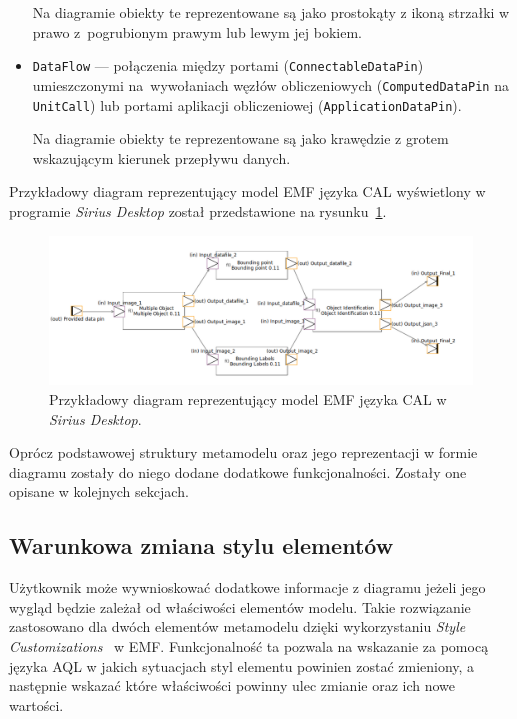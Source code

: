 \begin{itemize}
	      Na diagramie obiekty te reprezentowane są jako prostokąty z ikoną strzałki w prawo z~pogrubionym prawym lub lewym jej bokiem.

	\item \texttt{DataFlow} --- połączenia między portami
	      (\texttt{ConnectableDataPin}) umieszczonymi na~wywołaniach węzłów
	      obliczeniowych (\texttt{ComputedDataPin} na \texttt{UnitCall}) lub portami aplikacji obliczeniowej (\texttt{ApplicationDataPin}).

	      Na diagramie obiekty te reprezentowane są jako krawędzie z grotem wskazującym kierunek przepływu danych.
\end{itemize}

Przykładowy diagram reprezentujący model EMF języka CAL wyświetlony w programie
\emph{Sirius Desktop} został przedstawione na
rysunku~\ref{rys:sirius-desktop-cal-example-model}.

\begin{figure}[!ht]
	\centering

	\includegraphics[width=0.95\linewidth]{./images/sirius-desktop-cal-example-model.png}
	\caption{Przykładowy diagram reprezentujący model EMF języka CAL w
		\emph{Sirius Desktop}.}\label{rys:sirius-desktop-cal-example-model}
\end{figure}

Oprócz podstawowej struktury metamodelu oraz jego reprezentacji w formie
diagramu zostały do niego dodane dodatkowe funkcjonalności. Zostały one opisane
w kolejnych sekcjach.

\subsection{Warunkowa zmiana stylu elementów}

Użytkownik może wywnioskować dodatkowe informacje z diagramu jeżeli jego wygląd
będzie zależał od właściwości elementów modelu. Takie rozwiązanie zastosowano
dla dwóch elementów metamodelu dzięki wykorzystaniu \emph{Style
	Customizations}~\cite{sirius-desktop-documentation-style-customizations}
w \gls{EMF}.
Funkcjonalność ta pozwala na wskazanie za pomocą języka \gls{AQL} w jakich
sytuacjach styl elementu powinien zostać zmieniony, a następnie wskazać które
właściwości powinny ulec zmianie oraz ich nowe wartości.

